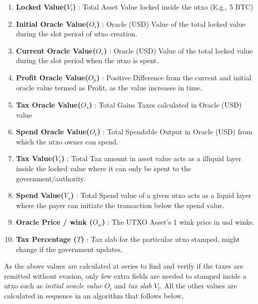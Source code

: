 \documentclass[letterpaper,11pt]{article}
\begin{document}
\begin{enumerate}[wide, labelwidth=!, labelindent=0pt]
\item \textbf{Locked Value($V_l$)} : Total Asset Value locked inside the utxo (E.g., 5 BTC)
\item \textbf{Initial Oracle Value($O_i$)} : Oracle (USD) Value of the total locked value during the slot period of utxo creation.
\item \textbf{Current Oracle Value($O_c$)} : Oracle (USD) Value of the total locked value during the slot period when the utxo is spent.
\item \textbf{Profit Oracle Value($O_p$)} : Positive Difference from the current and initial oracle value termed as Profit, as the value increases in time.
\item \textbf{Tax Oracle Value($O_s$)} : Total Gains Taxes calculated in Oracle (USD) value 
\item \textbf{Spend Oracle Value($O_t$)} : Total Spendable Output in Oracle (USD) from which the utxo owner can spend.
\item \textbf{Tax Value($V_t$)} : Total Tax amount in asset value acts as a illiquid layer inside the locked value where it can only be spent to the government/authority.
\item \textbf{Spend Value($V_s$)} : Total Spend value of a given utxo acts as a liquid layer where the payer can initiate the transaction below the spend value.
\item \textbf{Oracle Price / wink ($O_w$)} : The UTXO Asset's 1 wink price in usd winks.
\item \textbf{Tax Percentage ($T$)} : Tax slab for the particular utxo stamped, might change if the government updates.
\end{enumerate}

As the above values are calculated at series to find and verify if the taxes are remitted without evasion, only few extra fields are needed to stamped inside a utxo such as \textit{initial oracle value} $O_i$ and \textit{tax slab} $V_l$. All the other values are calculated in sequence in an algorithm that follows below,
\end{document}
